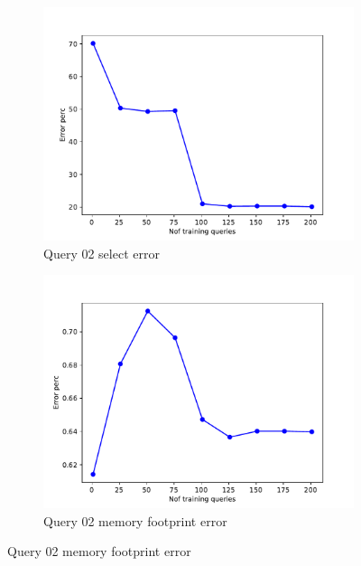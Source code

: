 \begin{figure}[!htb]
  \begin{subfigure}[t]{0.5\textwidth}
    \includegraphics[scale=0.4]{figs/tpch10/tpch10_sel02_error.pdf}
    \caption{Query 02 select error}
    \label{fig:tpch_sel02}
   \end{subfigure}
   \begin{subfigure}[t]{0.5\textwidth}
     \includegraphics[scale=0.4]{figs/tpch10/tpch10_q02_memerror.pdf}
     \caption{Query 02 memory footprint error}
     \label{fig:tpch_mem02}
   \end{subfigure}



\end{figure}
